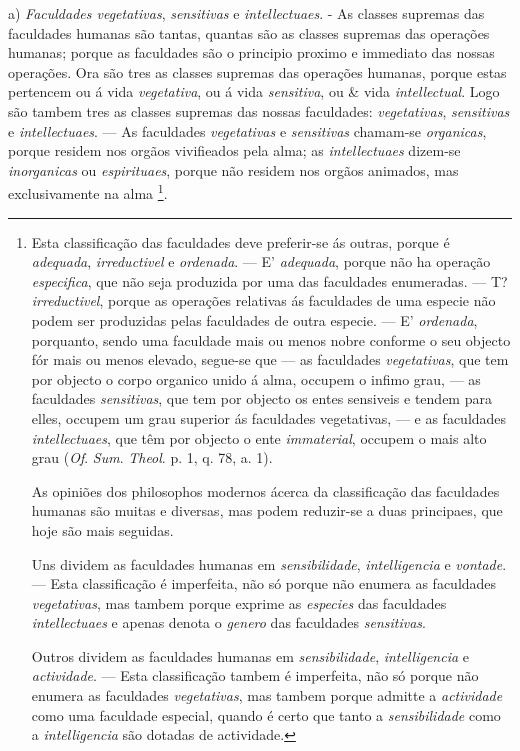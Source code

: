 a) \emph{Faculdades vegetativas}, \emph{sensitivas} e \emph{intellectuaes}. - As classes supremas das faculdades humanas são tantas, quantas são as classes supremas das operações humanas; porque as faculdades são o principio proximo e immediato das nossas operações. Ora são tres as classes supremas das operações humanas, porque estas pertencem ou á vida \emph{vegetativa}, ou á vida \emph{sensitiva}, ou \& vida \emph{intellectual}. Logo são tambem tres as classes supremas das nossas faculdades: \emph{vegetativas}, \emph{sensitivas} e \emph{intellectuaes}. --- As faculdades \emph{vegetativas} e \emph{sensitivas} chamam-se \emph{organicas}, porque residem nos orgãos vivifieados pela alma; as \emph{intellectuaes} dizem-se \emph{inorganicas} ou \emph{espirituaes}, porque não residem nos orgãos animados, mas exclusivamente na alma \footnote{Esta classificação das faculdades deve preferir-se ás outras, porque é \emph{adequada}, \emph{irreductivel} e \emph{ordenada}. --- E' \emph{adequada}, porque não ha operação \emph{especifica}, que não seja produzida por uma das faculdades enumeradas. --- T? \emph{irreductivel}, porque as operações relativas ás faculdades de uma especie não podem ser produzidas pelas faculdades de outra especie. --- E' \emph{ordenada}, porquanto, sendo uma faculdade mais ou menos nobre conforme o seu objecto fór mais ou menos elevado, segue-se que --- as faculdades \emph{vegetativas}, que tem por objecto o corpo organico unido á alma, occupem o infimo grau, --- as faculdades \emph{sensitivas}, que tem por objecto os entes sensiveis e tendem para elles, occupem um grau superior ás faculdades vegetativas, --- e as faculdades \emph{intellectuaes}, que têm por objecto o ente \emph{immaterial}, occupem o mais alto grau (\emph{Of}. \emph{Sum}. \emph{Theol}. p. 1, q. 78, a. 1).\par As opiniões dos philosophos modernos ácerca da classificação das faculdades humanas são muitas e diversas, mas podem reduzir-se a duas principaes, que hoje são mais seguidas.\par Uns dividem as faculdades humanas em \emph{sensibilidade}, \emph{intelligencia} e \emph{vontade}. --- Esta classificação é imperfeita, não só porque não enumera as faculdades \emph{vegetativas}, mas tambem porque exprime as \emph{especies} das faculdades \emph{intellectuaes} e apenas denota o \emph{genero} das faculdades \emph{sensitivas}.\par Outros dividem as faculdades humanas em \emph{sensibilidade}, \emph{intelligencia} e \emph{actividade}. --- Esta classificação tambem é imperfeita, não só porque não enumera as faculdades \emph{vegetativas}, mas tambem porque admitte a \emph{actividade} como uma faculdade especial, quando é certo que tanto a \emph{sensibilidade} como a \emph{intelligencia} são dotadas de actividade.}.

